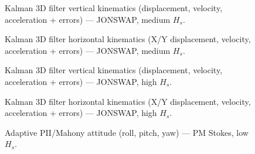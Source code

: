 \documentclass[11pt,letterpaper]{article}
\begin{document}

\begin{figure}[H]\centering
  \resizebox{\textwidth}{!}{}
  \caption{Kalman 3D filter vertical kinematics (displacement, velocity, acceleration + errors) — JONSWAP, medium $H_s$.}
  \label{fig:w3d_jonswap_medium_zkin}
\end{figure}

\begin{figure}[H]\centering
  \resizebox{\textwidth}{!}{}
  \caption{Kalman 3D filter horizontal kinematics (X/Y displacement, velocity, acceleration + errors) — JONSWAP, medium $H_s$.}
  \label{fig:w3d_jonswap_medium_xykin}
\end{figure}


\begin{figure}[H]\centering
  \resizebox{\textwidth}{!}{}
  \caption{Kalman 3D filter vertical kinematics (displacement, velocity, acceleration + errors) — JONSWAP, high $H_s$.}
  \label{fig:w3d_jonswap_high_zkin}
\end{figure}

\begin{figure}[H]\centering
  \resizebox{\textwidth}{!}{}
  \caption{Kalman 3D filter horizontal kinematics (X/Y displacement, velocity, acceleration + errors) — JONSWAP, high $H_s$.}
  \label{fig:w3d_jonswap_high_xykin}
\end{figure}



\begin{figure}[H]\centering
  \resizebox{\textwidth}{!}{}
  \caption{Adaptive PII/Mahony attitude (roll, pitch, yaw) --- PM Stokes, low $H_s$.}
  \label{fig:w3d_nonkalman_pmstokes_low_angles}
\end{figure}
\end{document}
